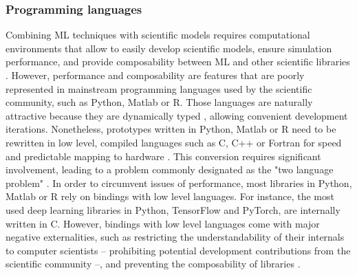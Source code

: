 

\subsubsection*{Programming languages}

Combining ML techniques with scientific models requires computational environments that allow to easily develop scientific models, ensure simulation performance, and provide composability between ML and other scientific libraries \cite{Rackauckas2020}. However, performance and composability are features that are poorly represented in mainstream programming languages used by the scientific community, such as Python, Matlab or R.
% 
Those languages are naturally attractive because they are dynamically typed \cite{XX}, allowing convenient development iterations. Nonetheless, prototypes written in Python, Matlab or R need to be rewritten in low level, compiled languages such as C, C++ or Fortran for speed and predictable mapping to hardware \cite{Perkel2019,Bezanson2017}. This conversion requires significant involvement, leading to a problem commonly designated as the "two language problem" \cite{Bezanson2017}.
% 
In order to circumvent issues of performance, most libraries in Python, Matlab or R rely on bindings with low level languages. For instance, the most used deep learning libraries in Python, TensorFlow and PyTorch, are internally written in C. However, bindings with low level languages come with major negative externalities, such as restricting the understandability of their internals to computer scientists -- prohibiting potential development contributions from the scientific community --, and preventing the composability of libraries \cite{XXX}. 

